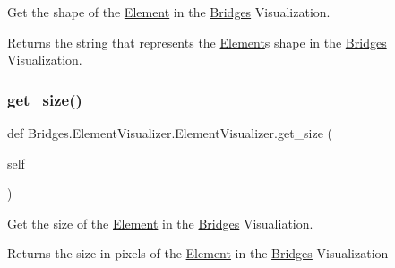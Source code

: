 Get the shape of the \mbox{\hyperlink{namespace_bridges_1_1_element}{Element}} in the \mbox{\hyperlink{namespace_bridges_1_1_bridges}{Bridges}} Visualization. 

\begin{DoxyReturn}{Returns}
the string that represents the \mbox{\hyperlink{namespace_bridges_1_1_element}{Element}}\textquotesingle{}s shape in the \mbox{\hyperlink{namespace_bridges_1_1_bridges}{Bridges}} Visualization. 
\end{DoxyReturn}
\mbox{\label{class_bridges_1_1_element_visualizer_1_1_element_visualizer_a12bbfd402a0e05e625d36f0ef5a3bcef}} 
\subsubsection{\texorpdfstring{get\+\_\+size()}{get\_size()}}
{\footnotesize\ttfamily def Bridges.\+Element\+Visualizer.\+Element\+Visualizer.\+get\+\_\+size (\begin{DoxyParamCaption}\item[{}]{self }\end{DoxyParamCaption})}



Get the size of the \mbox{\hyperlink{namespace_bridges_1_1_element}{Element}} in the \mbox{\hyperlink{namespace_bridges_1_1_bridges}{Bridges}} Visualiation. 

\begin{DoxyReturn}{Returns}
the size in pixels of the \mbox{\hyperlink{namespace_bridges_1_1_element}{Element}} in the \mbox{\hyperlink{namespace_bridges_1_1_bridges}{Bridges}} Visualization 
\end{DoxyReturn}
\mbox{\label{class_bridges_1_1_element_visualizer_1_1_element_visualizer_aceb8f72766f7656162d0942891fc8f09}} 
